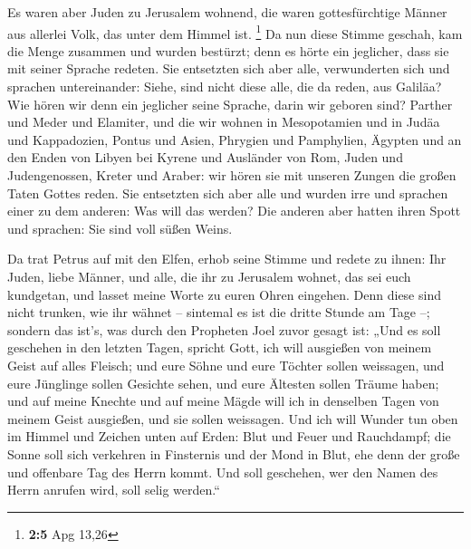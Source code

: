  Es waren aber Juden zu Jerusalem wohnend, die waren
gottesfürchtige Männer aus allerlei Volk, das unter dem Himmel ist.
\footnote{\textbf{2:5} Apg 13,26}  Da nun diese Stimme
geschah, kam die Menge zusammen und wurden bestürzt; denn es hörte ein
jeglicher, dass sie mit seiner Sprache redeten.  Sie
entsetzten sich aber alle, verwunderten sich und sprachen untereinander:
Siehe, sind nicht diese alle, die da reden, aus Galiläa? 
Wie hören wir denn ein jeglicher seine Sprache, darin wir geboren sind?
 Parther und Meder und Elamiter, und die wir wohnen in
Mesopotamien und in Judäa und Kappadozien, Pontus und Asien,
 Phrygien und Pamphylien, Ägypten und an den Enden von
Libyen bei Kyrene und Ausländer von Rom,  Juden und
Judengenossen, Kreter und Araber: wir hören sie mit unseren Zungen die
großen Taten Gottes reden.  Sie entsetzten sich aber alle
und wurden irre und sprachen einer zu dem anderen: Was will das werden?
 Die anderen aber hatten ihren Spott und sprachen: Sie sind
voll süßen Weins.

 Da trat Petrus auf mit den Elfen, erhob seine Stimme und
redete zu ihnen: Ihr Juden, liebe Männer, und alle, die ihr zu Jerusalem
wohnet, das sei euch kundgetan, und lasset meine Worte zu euren Ohren
eingehen.  Denn diese sind nicht trunken, wie ihr wähnet --
sintemal es ist die dritte Stunde am Tage --;  sondern das
ist's, was durch den Propheten Joel zuvor gesagt ist:  „Und
es soll geschehen in den letzten Tagen, spricht Gott, ich will ausgießen
von meinem Geist auf alles Fleisch; und eure Söhne und eure Töchter
sollen weissagen, und eure Jünglinge sollen Gesichte sehen, und eure
Ältesten sollen Träume haben;  und auf meine Knechte und
auf meine Mägde will ich in denselben Tagen von meinem Geist ausgießen,
und sie sollen weissagen.  Und ich will Wunder tun oben im
Himmel und Zeichen unten auf Erden: Blut und Feuer und Rauchdampf;
 die Sonne soll sich verkehren in Finsternis und der Mond
in Blut, ehe denn der große und offenbare Tag des Herrn kommt.
 Und soll geschehen, wer den Namen des Herrn anrufen wird,
soll selig werden.``

